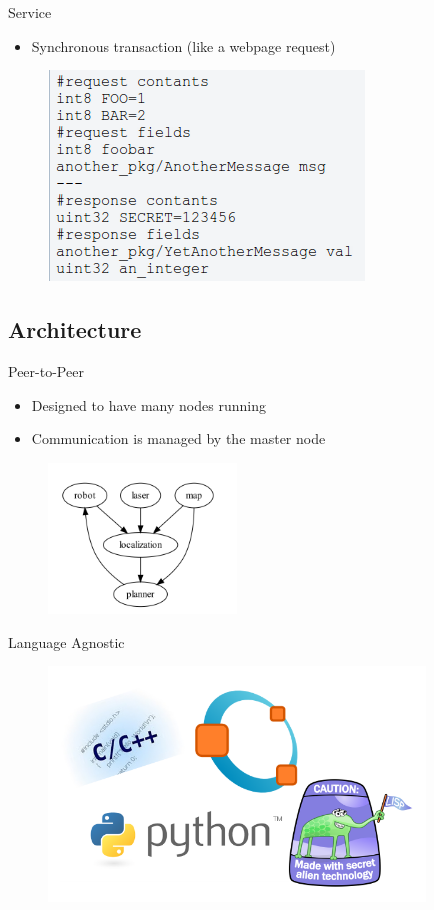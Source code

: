 \documentclass{beamer}
\begin{document}
\begin{frame}{Service}
  \begin{itemize}
  \item Synchronous transaction (like a webpage request)
  \end{itemize}

  \begin{figure}
    \includegraphics[scale=0.65]{service.png}
  \end{figure}
\end{frame}


\subsection{Architecture}
\begin{frame}{Peer-to-Peer}
  \begin{itemize}
  \item Designed to have many nodes running
  \item Communication is managed by the master node
  \end{itemize}

  \begin{figure}
    \includegraphics[width=5.0cm]{network_graph.png}
  \end{figure}
\end{frame}

\begin{frame}{Language Agnostic}
  \begin{figure}
    \includegraphics[width=10cm]{lang-logo.png}
  \end{figure}
\end{frame}
\end{document}
